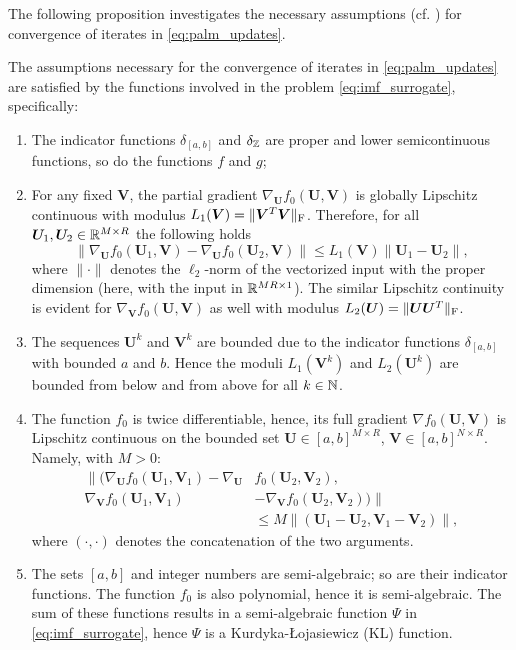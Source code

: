 The following proposition investigates the necessary assumptions (cf. \cite[Asm. 1 and Asm. 2]{bolte2014proximal}) for convergence of iterates in \eqref{eq:palm_updates}.
\begin{prop}\label{prop:assumptions}
    The assumptions necessary for the convergence of iterates in \eqref{eq:palm_updates} are satisfied by the functions involved in the problem \eqref{eq:imf_surrogate}, specifically:
    \begin{enumerate}
        \item The indicator functions $\delta_{[a,b]}$ and $\delta_{\mathbb{Z}}$ are proper and lower semicontinuous functions, so do the functions $f$ and $g$;
        \item For any fixed $\bm V$, the partial gradient $\nabla_{\bm U} f_0(\bm U, \bm V)$ is globally Lipschitz continuous with modulus $L_1(\bm V) = \|\bm V^T \bm V\|_{\rm F}$. Therefore, for all $\bm U_1,\bm U_2 \in \mathbb{R}^{M\times R}$ the following holds
              \begin{equation*}
                  \|\nabla_{\bm U} f_0(\bm U_1, \bm V) - \nabla_{\bm U} f_0(\bm U_2, \bm V)\| \leq L_1(\bm V) \|\bm U_1 - \bm U_2\|,
              \end{equation*}
              where $\|\cdot\|$ denotes the $\ell_2$-norm of the vectorized input with the proper dimension (here, with the input in $\mathbb{R}^{MR\times 1}$).
              The similar Lipschitz continuity is evident for $\nabla_{\bm V} f_0(\bm U, \bm V)$ as well with modulus $L_2(\bm U) = \|\bm U \bm U^T\|_{\rm F}$.
        \item The sequences $\bm U^k$ and $\bm V^k$ are bounded due to the indicator functions $\delta_{[a,b]}$ with bounded $a$ and $b$. Hence the moduli $L_1(\bm V^k)$ and $L_2(\bm U^k)$ are bounded from below and from above for all $k\in\mathbb{N}$.
        \item The function $f_0$ is twice differentiable, hence, its full gradient $\nabla f_0(\bm U,\bm V)$ is Lipschitz continuous on the bounded set $\bm U \in [a,b]^{M\times R}$, $\bm V \in [a,b]^{N\times R}$. Namely, with $M > 0$:
              \begin{align*}
                  \|\big(\nabla_{\bm U} f_0(\bm U_1, \bm V_1) - \nabla_{\bm U} & f_0(\bm U_2, \bm V_2),                             \\
                  \nabla_{\bm V} f_0(\bm U_1, \bm V_1)                         & - \nabla_{\bm V} f_0(\bm U_2, \bm V_2)\big)\|      \\
                                                                               & \leq M \|(\bm U_1 - \bm U_2, \bm V_1 - \bm V_2)\|,
              \end{align*}
              where $(\cdot,\cdot)$ denotes the concatenation of the two arguments.
        \item The sets $[a,b]$ and integer numbers are semi-algebraic; so are their indicator functions. The function $f_0$ is also polynomial, hence it is semi-algebraic. The sum of these functions results in a semi-algebraic function $\Psi$ in \eqref{eq:imf_surrogate}, hence $\Psi$ is a Kurdyka-Łojasiewicz (KL) function.
    \end{enumerate}
\end{prop}
